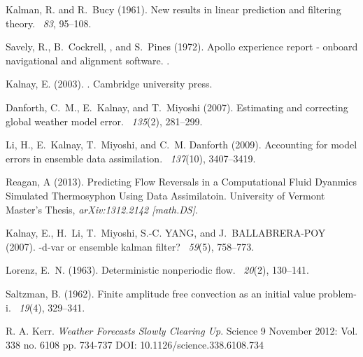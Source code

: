 \documentclass[onecolumn]{article}
\begin{document}
\begin{multicols}{2}
\begin{thebibliography}{9}
        Kalman, R. and R.~Bucy (1961).
        \newblock New results in linear prediction and filtering theory.
        ~{\em 83}, 95--108.
        
        Savely, R., B.~Cockrell, , and S.~Pines (1972).
        \newblock Apollo experience report - onboard navigational and alignment
          software.
        .
        
        Kalnay, E. (2003).
        .
        \newblock Cambridge university press.
        
        Danforth, C.~M., E.~Kalnay, and T.~Miyoshi (2007).
        \newblock Estimating and correcting global weather model error.
        ~{\em 135\/}(2), 281--299.
        
        Li, H., E.~Kalnay, T.~Miyoshi, and C.~M. Danforth (2009).
        \newblock Accounting for model errors in ensemble data assimilation.
        ~{\em 137\/}(10), 3407--3419.

        Reagan, A (2013).
        \newblock Predicting Flow Reversals in a Computational Fluid Dyanmics Simulated Thermosyphon Using Data Assimilatoin.
        \newblock University of Vermont Master's Thesis, {\em arXiv:1312.2142 [math.DS]}.

        Kalnay, E., H.~Li, T.~Miyoshi, S.-C. YANG, and J.~BALLABRERA-POY (2007).
        -d-var or ensemble kalman filter?
        ~{\em 59\/}(5), 758--773.

        Lorenz, E.~N. (1963).
        \newblock Deterministic nonperiodic flow.
        ~{\em 20\/}(2), 130--141.

        Saltzman, B. (1962).
        \newblock Finite amplitude free convection as an initial value problem-i.
        ~{\em 19\/}(4), 329--341.

	R. A. Kerr. \emph{Weather Forecasts Slowly Clearing Up}. Science 9 November 2012: Vol. 338 no. 6108 pp. 734-737 DOI: 10.1126/science.338.6108.734


\end{thebibliography}
\end{multicols}
\end{document}
